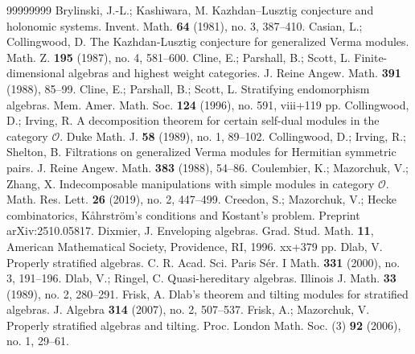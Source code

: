 \documentclass[a4paper]{amsart}
\begin{document}
\begin{thebibliography}{99999999}
 Brylinski, J.-L.; Kashiwara, M. Kazhdan--Lusztig conjecture 
and holonomic systems. Invent. Math. {\bf 64} (1981), no. 3, 387--410.
Casian, L.; Collingwood, D. 
The Kazhdan-Lusztig conjecture for generalized Verma modules. 
Math. Z. {\bf 195} (1987), no. 4, 581--600.
Cline, E.; Parshall, B.; Scott, L.
Finite-dimensional algebras and highest weight categories.
J. Reine Angew. Math. {\bf 391} (1988), 85--99.
Cline, E.; Parshall, B.; Scott, L.
Stratifying endomorphism algebras.
Mem. Amer. Math. Soc. {\bf 124} (1996), no. 591, viii+119 pp.
Collingwood, D.; Irving, R. A decomposition theorem for certain 
self-dual modules in the category $\mathcal{O}$. 
Duke Math. J. {\bf 58} (1989), no. 1, 89--102.
Collingwood, D.; Irving, R.; Shelton, B. Filtrations on 
generalized Verma modules for Hermitian symmetric pairs. 
J. Reine Angew. Math. {\bf 383} (1988), 54--86. 
Coulembier, K.; Mazorchuk, V.; Zhang, X.
Indecomposable manipulations with simple modules in category $\mathcal{O}$.
Math. Res. Lett. {\bf 26} (2019), no. 2, 447--499.
Creedon, S.; Mazorchuk, V.;
Hecke combinatorics, K{\aa}hrstr{\"o}m's conditions and 
Kostant's problem. Preprint arXiv:2510.05817.
Dixmier, J. Enveloping algebras. Grad. Stud. Math. {\bf 11},
American Mathematical Society, Providence, RI, 1996. xx+379 pp.
Dlab, V. Properly stratified algebras.
C. R. Acad. Sci. Paris S{\'e}r. I Math. {\bf 331} (2000), no. 3, 191--196.
Dlab, V.; Ringel, C.
Quasi-hereditary algebras.
Illinois J. Math. {\bf 33} (1989), no. 2, 280--291.
Frisk, A.
Dlab's theorem and tilting modules for stratified algebras.
J. Algebra {\bf 314} (2007), no. 2, 507--537.
Frisk, A.; Mazorchuk, V.
Properly stratified algebras and tilting.
Proc. London Math. Soc. (3) {\bf 92} (2006), no. 1, 29--61.

\end{thebibliography}
\end{document}
